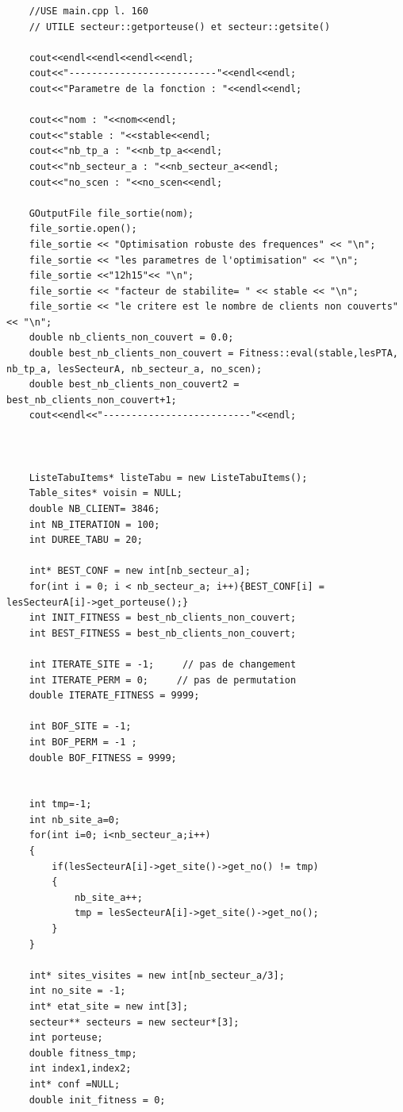 \documentclass[a4paper, 11pt]{report}
\begin{document}
\begin{lstlisting}
	//USE main.cpp l. 160
    // UTILE secteur::getporteuse() et secteur::getsite()

    cout<<endl<<endl<<endl<<endl;
    cout<<"--------------------------"<<endl<<endl;
    cout<<"Parametre de la fonction : "<<endl<<endl;

    cout<<"nom : "<<nom<<endl;
    cout<<"stable : "<<stable<<endl;
    cout<<"nb_tp_a : "<<nb_tp_a<<endl;
    cout<<"nb_secteur_a : "<<nb_secteur_a<<endl;
    cout<<"no_scen : "<<no_scen<<endl;

    GOutputFile file_sortie(nom);
	file_sortie.open();
    file_sortie << "Optimisation robuste des frequences" << "\n";
    file_sortie << "les parametres de l'optimisation" << "\n";
    file_sortie <<"12h15"<< "\n";
    file_sortie << "facteur de stabilite= " << stable << "\n";
    file_sortie << "le critere est le nombre de clients non couverts"<< "\n";
	double nb_clients_non_couvert = 0.0;
	double best_nb_clients_non_couvert = Fitness::eval(stable,lesPTA, nb_tp_a, lesSecteurA, nb_secteur_a, no_scen);
	double best_nb_clients_non_couvert2 = best_nb_clients_non_couvert+1;
    cout<<endl<<"--------------------------"<<endl;



    ListeTabuItems* listeTabu = new ListeTabuItems();
    Table_sites* voisin = NULL;
    double NB_CLIENT= 3846;
    int NB_ITERATION = 100;
    int DUREE_TABU = 20;

    int* BEST_CONF = new int[nb_secteur_a];
    for(int i = 0; i < nb_secteur_a; i++){BEST_CONF[i] = lesSecteurA[i]->get_porteuse();}
    int INIT_FITNESS = best_nb_clients_non_couvert;
    int BEST_FITNESS = best_nb_clients_non_couvert;

    int ITERATE_SITE = -1;     // pas de changement
    int ITERATE_PERM = 0;     // pas de permutation
    double ITERATE_FITNESS = 9999;

    int BOF_SITE = -1;
    int BOF_PERM = -1 ;
    double BOF_FITNESS = 9999;


    int tmp=-1;
    int nb_site_a=0;
    for(int i=0; i<nb_secteur_a;i++)
    {
        if(lesSecteurA[i]->get_site()->get_no() != tmp)
        {
            nb_site_a++;
            tmp = lesSecteurA[i]->get_site()->get_no();
        }
    }

    int* sites_visites = new int[nb_secteur_a/3];
    int no_site = -1;
    int* etat_site = new int[3];
    secteur** secteurs = new secteur*[3];
    int porteuse;
    double fitness_tmp;
    int index1,index2;
    int* conf =NULL;
    double init_fitness = 0;


\end{lstlisting}
\end{document}
